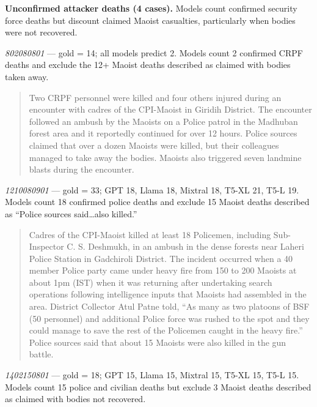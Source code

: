 \documentclass[
  11pt,
]{article}
\begin{document}
\medskip\noindent \textbf{Unconfirmed attacker deaths (4 cases).} Models
count confirmed security force deaths but discount claimed Maoist
casualties, particularly when bodies were not recovered.

\smallskip\noindent \emph{802080801} --- gold = 14; all models predict
2. Models count 2 confirmed CRPF deaths and exclude the 12+ Maoist
deaths described as claimed with bodies taken away.

\begin{quote}
Two CRPF personnel were killed and four others injured during an
encounter with cadres of the CPI-Maoist in Giridih District. The
encounter followed an ambush by the Maoists on a Police patrol in the
Madhuban forest area and it reportedly continued for over 12 hours.
Police sources claimed that over a dozen Maoists were killed, but their
colleagues managed to take away the bodies. Maoists also triggered seven
landmine blasts during the encounter.
\end{quote}

\noindent \emph{1210080901} --- gold = 33; GPT 18, Llama 18, Mixtral 18,
T5-XL 21, T5-L 19. Models count 18 confirmed police deaths and exclude
15 Maoist deaths described as ``Police sources said\ldots also killed.''

\begin{quote}
Cadres of the CPI-Maoist killed at least 18 Policemen, including
Sub-Inspector C. S. Deshmukh, in an ambush in the dense forests near
Laheri Police Station in Gadchiroli District. The incident occurred when
a 40 member Police party came under heavy fire from 150 to 200 Maoists
at about 1pm (IST) when it was returning after undertaking search
operations following intelligence inputs that Maoists had assembled in
the area. District Collector Atul Patne told, ``As many as two platoons
of BSF (50 personnel) and additional Police force was rushed to the spot
and they could manage to save the rest of the Policemen caught in the
heavy fire.'' Police sources said that about 15 Maoists were also killed
in the gun battle.
\end{quote}

\noindent \emph{1402150801} --- gold = 18; GPT 15, Llama 15, Mixtral 15,
T5-XL 15, T5-L 15. Models count 15 police and civilian deaths but
exclude 3 Maoist deaths described as claimed with bodies not recovered.
\end{document}
